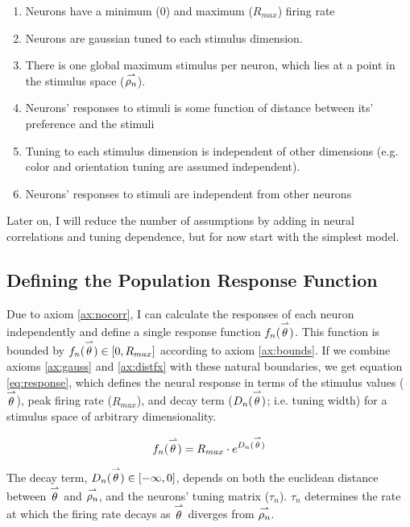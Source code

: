\begin{enumerate}
	\item \label{ax:bounds} Neurons have a minimum ($0$) and maximum ($R_{max}$) firing rate 
	\item \label{ax:gauss} Neurons are gaussian tuned to each stimulus dimension.
	\item There is one global maximum stimulus per neuron, which lies at a point in the stimulus space ($\overset{\rightharpoonup}{\rho_n}$).
	\item \label{ax:distfx} Neurons' responses to stimuli is some function of distance between its' preference and the stimuli
	\item Tuning to each stimulus dimension is independent of other dimensions (e.g. color and orientation tuning are assumed independent).
	\item \label{ax:nocorr} Neurons' responses to stimuli are independent from other neurons
\end{enumerate}

Later on, I will reduce the number of assumptions by adding in neural correlations and tuning dependence, but for now start with the simplest model. 

\subsection{Defining the Population Response Function}

Due to axiom \ref{ax:nocorr}, I can calculate the responses of each neuron independently and define a single response function $f_n(\overset{\rightharpoonup}\theta)$. This function is bounded by $f_n(\overset{\rightharpoonup}\theta) \in [0, R_{max}]$ according to axiom \ref{ax:bounds}. If we combine axioms \ref{ax:gauss} and \ref{ax:distfx} with these natural boundaries, we get equation \ref{eq:response}, which defines the neural response in terms of the stimulus values ($\overset{\rightharpoonup}\theta$), peak firing rate ($R_{max}$), and decay term ($D_n(\overset{\rightharpoonup}\theta)$; i.e. tuning width) for a stimulus space of arbitrary dimensionality.

\begin{equation}
	\label{eq:response}
	f_n(\overset{\rightharpoonup}{\theta}) = R_{max} \cdot e^{D_n(\overset{\rightharpoonup}\theta)}
\end{equation}

The decay term, ${D_n(\overset{\rightharpoonup}\theta)} \in [-\infty, 0]$, depends on both the euclidean distance between $\overset{\rightharpoonup}\theta$ and $\overset{\rightharpoonup}{\rho_n}$, and the neurons' tuning matrix ($\tau_n$). $\tau_n$ determines the rate at which the firing rate decays as $\overset{\rightharpoonup}\theta$ diverges from $\overset{\rightharpoonup}{\rho_n}$.

